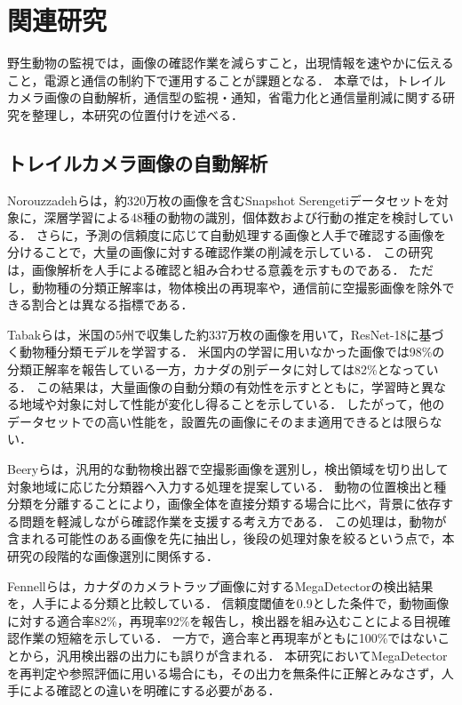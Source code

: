 \chapter{関連研究}
\label{chap:related}

野生動物の監視では，画像の確認作業を減らすこと，出現情報を速やかに伝えること，電源と通信の制約下で運用することが課題となる．
本章では，トレイルカメラ画像の自動解析，通信型の監視・通知，省電力化と通信量削減に関する研究を整理し，本研究の位置付けを述べる．

\section{トレイルカメラ画像の自動解析}
Norouzzadehら\cite{Norouzzadeh2018}は，約320万枚の画像を含むSnapshot Serengetiデータセットを対象に，深層学習による48種の動物の識別，個体数および行動の推定を検討している．
さらに，予測の信頼度に応じて自動処理する画像と人手で確認する画像を分けることで，大量の画像に対する確認作業の削減を示している．
この研究は，画像解析を人手による確認と組み合わせる意義を示すものである．
ただし，動物種の分類正解率は，物体検出の再現率や，通信前に空撮影画像を除外できる割合とは異なる指標である．

Tabakら\cite{Tabak2019}は，米国の5州で収集した約337万枚の画像を用いて，ResNet-18に基づく動物種分類モデルを学習する．
米国内の学習に用いなかった画像では98\%の分類正解率を報告している一方，カナダの別データに対しては82\%となっている．
この結果は，大量画像の自動分類の有効性を示すとともに，学習時と異なる地域や対象に対して性能が変化し得ることを示している．
したがって，他のデータセットでの高い性能を，設置先の画像にそのまま適用できるとは限らない．

Beeryら\cite{Beery2019}は，汎用的な動物検出器で空撮影画像を選別し，検出領域を切り出して対象地域に応じた分類器へ入力する処理を提案している．
動物の位置検出と種分類を分離することにより，画像全体を直接分類する場合に比べ，背景に依存する問題を軽減しながら確認作業を支援する考え方である．
この処理は，動物が含まれる可能性のある画像を先に抽出し，後段の処理対象を絞るという点で，本研究の段階的な画像選別に関係する．

Fennellら\cite{Fennell2022}は，カナダのカメラトラップ画像に対するMegaDetectorの検出結果を，人手による分類と比較している．
信頼度閾値を0.9とした条件で，動物画像に対する適合率82\%，再現率92\%を報告し，検出器を組み込むことによる目視確認作業の短縮を示している．
一方で，適合率と再現率がともに100\%ではないことから，汎用検出器の出力にも誤りが含まれる．
本研究においてMegaDetectorを再判定や参照評価に用いる場合にも，その出力を無条件に正解とみなさず，人手による確認との違いを明確にする必要がある．

